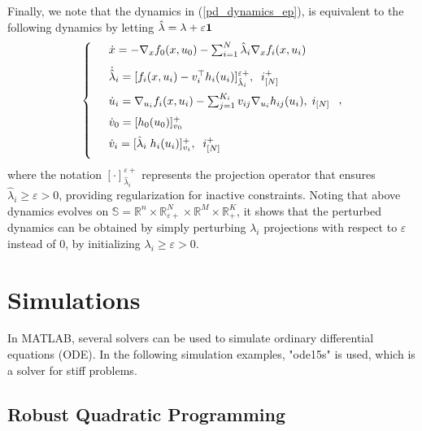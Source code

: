 \documentclass[journal,twoside,web]{ieeecolor}
\begin{document}
Finally, we note that the dynamics in (\ref{pd_dynamics_ep}), is equivalent to the following dynamics by letting $\hat{\lambda}=\lambda+\varepsilon {\bf 1}$
\begin{align} \label{pd_dynamics_0}
\left\{
\begin{array}{cl}
\vspace{3mm}
&\dot x=-\nabla_x f_0(x,u_0)-\sum_{i=1}^N\hat{\lambda}_i \nabla_x f_i(x,u_i)\\
\vspace{2mm}
&\dot{\hat{\lambda}}_i=[f_i(x,u_i)-v_i^\top h_i(u_i)]_{\hat{\lambda}_i}^{\varepsilon +},\;\; i^+_{[N]}\\
\vspace{2mm}
&\dot u_i=\nabla_{u_i}f_i(x,u_i)-\sum_{j=1}^{K_i} v_{ij} \nabla_{u_i} h_{ij}(u_i),\; i_{[N]}\\
\vspace{2mm}
&\dot{v}_0=[h_0(u_0)]_{v_0}^+\\
\vspace{2mm}
&\dot v_i=[\hat{\lambda}_i \; h_i(u_i)]_{v_i}^+,\;\;i^+_{[N]}
\end{array}\right.,
\end{align}
{\color{blue} where the notation $[\cdot]_{\hat{\lambda}_i}^{\varepsilon+}$ represents the projection operator that ensures $\hat{\lambda}_i \geq \varepsilon > 0$, providing regularization for inactive constraints.}
Noting that above dynamics evolves on $\mathbb{S}= \mathbb{R}^n \times \mathbb{R}^N_{\varepsilon +} \times \mathbb{R}^M \times \mathbb{R}^K_+$, it shows that the perturbed dynamics can be obtained by simply perturbing $\lambda_i$ projections with respect to $\varepsilon$ instead of $0$, by initializing $\lambda_i \geq \varepsilon > 0$.


\section{Simulations}\label{section_simulations}
In MATLAB, several solvers can be used to simulate ordinary differential equations (ODE). In the following simulation examples, "ode15s" is used, which is a solver for stiff problems.

\subsection{Robust Quadratic Programming}
\end{document}
